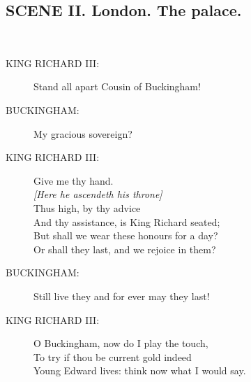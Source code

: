 \documentclass{article}
\begin{document}
\subsection*{SCENE II.  London. The palace.}
\\
\begin{description}
\item[KING RICHARD III:] 
\hspace{1pt}Stand all apart Cousin of Buckingham!\\
\end{description}
\begin{description}
\item[BUCKINGHAM:] 
\hspace{1pt}My gracious sovereign?\\
\end{description}
\begin{description}
\item[KING RICHARD III:] 
\hspace{1pt}Give me thy hand.\\
{\it [Here he ascendeth his throne]}\\
\hspace{1pt}Thus high, by thy advice\\
\hspace{1pt}And thy assistance, is King Richard seated;\\
\hspace{1pt}But shall we wear these honours for a day?\\
\hspace{1pt}Or shall they last, and we rejoice in them?\\
\end{description}
\begin{description}
\item[BUCKINGHAM:] 
\hspace{1pt}Still live they and for ever may they last!\\
\end{description}
\begin{description}
\item[KING RICHARD III:] 
\hspace{1pt}O Buckingham, now do I play the touch,\\
\hspace{1pt}To try if thou be current gold indeed\\
\hspace{1pt}Young Edward lives: think now what I would say.\\
\end{description}
\end{document}
